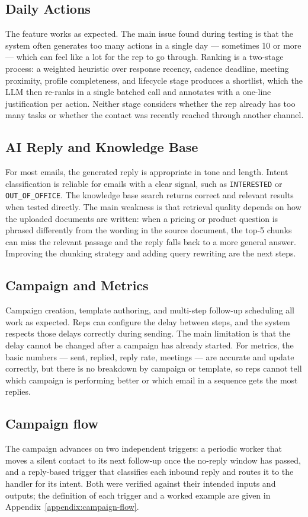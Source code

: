 \documentclass[a4paper]{article}
\begin{document}
\subsection{Daily Actions}
The feature works as expected. The main issue found during testing is that
the system often generates too many actions in a single day — sometimes 10 or
more — which can feel like a lot for the rep to go through. Ranking is a
two-stage process: a weighted heuristic over response recency, cadence
deadline, meeting proximity, profile completeness, and lifecycle stage
produces a shortlist, which the LLM then re-ranks in a single batched call
and annotates with a one-line justification per action. Neither stage
considers whether the rep already has too many tasks or whether the contact
was recently reached through another channel.

\subsection{AI Reply and Knowledge Base}
For most emails, the generated reply is appropriate in tone and length. Intent
classification is reliable for emails with a clear signal, such as
\texttt{INTERESTED} or \texttt{OUT\_OF\_OFFICE}. The knowledge base search
returns correct and relevant results when tested directly. The main weakness
is that retrieval quality depends on how the uploaded documents are written:
when a pricing or product question is phrased differently from the wording in
the source document, the top-5 chunks can miss the relevant passage and the
reply falls back to a more general answer. Improving the chunking strategy and
adding query rewriting are the next steps.

\subsection{Campaign and Metrics}
Campaign creation, template authoring, and multi-step follow-up scheduling all
work as expected. Reps can configure the delay between steps, and the system
respects those delays correctly during sending. The main limitation is that
the delay cannot be changed after a campaign has already started. For metrics,
the basic numbers — sent, replied, reply rate, meetings — are accurate and
update correctly, but there is no breakdown by campaign or template, so reps
cannot tell which campaign is performing better or which email in a sequence
gets the most replies.


\subsection{Campaign flow}
The campaign advances on two independent triggers: a periodic worker that
moves a silent contact to its next follow-up once the no-reply window has
passed, and a reply-based trigger that classifies each inbound reply and
routes it to the handler for its intent. Both were verified against their
intended inputs and outputs; the definition of each trigger and a worked
example are given in Appendix~\ref{appendix:campaign-flow}.
\end{document}
